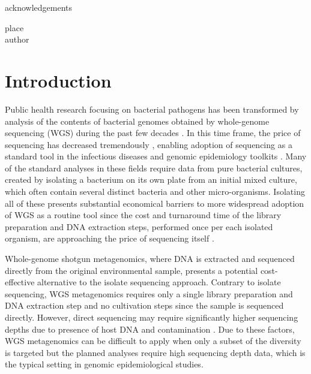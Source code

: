 \documentclass[officiallayout]{tktla}
\begin{document}
\begin{acknowledgements}
  acknowledgements
   \begin{flushright}
  place\\
  author
  \end{flushright}
\end{acknowledgements}

\tableofcontents

\mainmatter

\chapter{Introduction}

Public health research focusing on bacterial pathogens has been
transformed by analysis of the contents of bacterial genomes obtained
by whole-genome sequencing (WGS) during the past few decades
\citep{armstrong2019pathogen}. In this time frame, the price of
sequencing has decreased tremendously \citep{dnaseqcost,
  goodwin2016coming}, enabling adoption of sequencing as a standard
tool in the infectious diseases and genomic epidemiology toolkits
\citep{tang2017infection, grad2014epidemiologic, kwong2015whole}. Many
of the standard analyses in these fields require data from pure
bacterial cultures, created by isolating a bacterium on its own plate
from an initial mixed culture, which often contain several distinct
bacteria and other micro-organisms. Isolating all of these presents
substantial economical barriers to more widespread adoption of WGS as
a routine tool since the cost and turnaround time of the library
preparation and DNA extraction steps, performed once per each isolated
organism, are approaching the price of sequencing itself \citep{rossen2018practical}.

Whole-genome shotgun metagenomics, where DNA is extracted and
sequenced directly from the original environmental sample, presents a
potential cost-effective alternative to the isolate sequencing
approach. Contrary to isolate sequencing, WGS metagenomics requires
only a single library preparation and DNA extraction step and no
cultivation steps since the sample is sequenced directly. However,
direct sequencing may require significantly higher sequencing depths
due to presence of host DNA \citep{pereira2019impact,
  mcardle2020sensitivity} and contamination
\citep{mcardle2020sensitivity, salter2014reagent}. Due to these
factors, WGS metagenomics can be difficult to apply when only a subset
of the diversity is targeted but the planned analyses require high
sequencing depth data, which is the typical setting in genomic
epidemiological studies.
\end{document}
